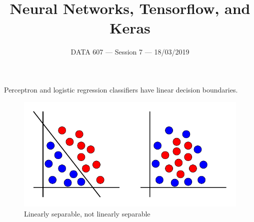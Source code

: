 \documentclass{beamer}
\begin{document}
    
\setlength{\parskip}{1em}
\begin{frame}
    \title{Neural Networks, Tensorflow, and Keras}
    \date{DATA 607 --- Session 7 --- 18/03/2019}
    \maketitle
\end{frame}

\begin{frame}{}
    Perceptron and logistic regression classifiers have linear decision boundaries.
    \begin{figure}
    \includegraphics[]{linear/linear.pdf}
    \caption{Linearly separable, not linearly separable}
    \end{figure}
\end{frame}
\end{document}
